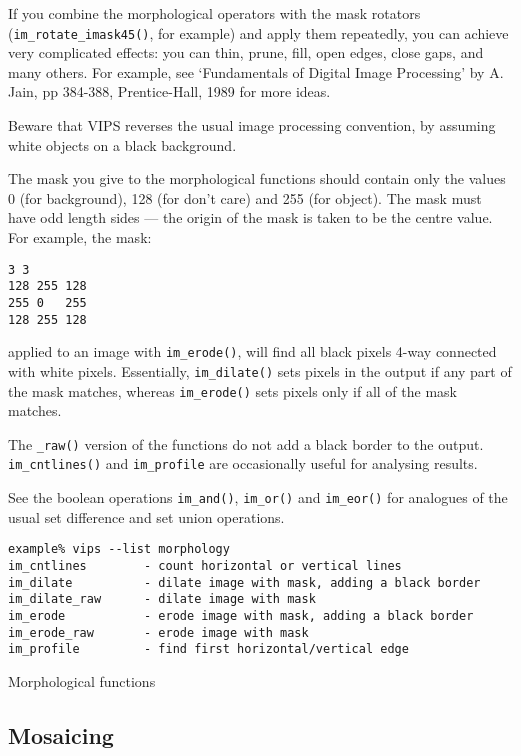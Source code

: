 If you combine the morphological operators with the mask rotators
(\verb+im_rotate_imask45()+, for example) and apply them repeatedly, you
can achieve very complicated effects: you can thin, prune, fill, open edges,
close gaps, and many others. For example, see `Fundamentals  of  Digital
Image Processing' by A.  Jain, pp 384-388, Prentice-Hall, 1989 for more ideas.

Beware that VIPS reverses the usual image processing convention, by assuming
white objects on a black background.

The mask you give to the morphological functions should contain only the
values 0 (for background), 128 (for don't care) and 255 (for object). The
mask must have odd length sides --- the origin of the mask is taken to be
the centre value. For example, the mask:

\begin{verbatim}
3 3 
128 255 128
255 0   255
128 255 128
\end{verbatim}
  
\noindent
applied to an image with \verb+im_erode()+, will find all black pixels
4-way connected with white pixels. Essentially, \verb+im_dilate()+
sets  pixels  in the output  if  any part of the mask matches, whereas
\verb+im_erode()+ sets pixels only if all of the mask matches.

The \verb+_raw()+ version of the functions do not add a black border to the
output. \verb+im_cntlines()+ and \verb+im_profile+ are occasionally useful for 
analysing results.

See the boolean operations \verb+im_and()+, \verb+im_or()+  and
\verb+im_eor()+ for  analogues of  the  usual  set difference and set
union operations.

\begin{fig2}
\begin{verbatim}
example% vips --list morphology
im_cntlines        - count horizontal or vertical lines
im_dilate          - dilate image with mask, adding a black border
im_dilate_raw      - dilate image with mask
im_erode           - erode image with mask, adding a black border
im_erode_raw       - erode image with mask
im_profile         - find first horizontal/vertical edge
\end{verbatim}
\caption{Morphological functions}
\label{fg:morph}
\end{fig2}

\subsection{Mosaicing}

